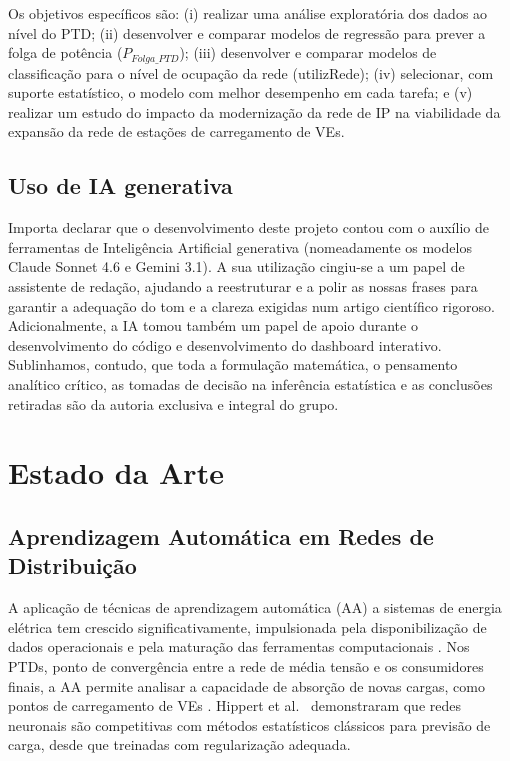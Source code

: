 \documentclass[conference]{IEEEtran}
\begin{document}
Os objetivos específicos são: (i) realizar uma análise exploratória dos dados ao nível do PTD; (ii) desenvolver e comparar modelos de regressão para prever a folga de potência ($P_{Folga\_PTD}$); (iii) desenvolver e comparar modelos de classificação para o nível de ocupação da rede (utilizRede); (iv) selecionar, com suporte estatístico, o modelo com melhor desempenho em cada tarefa; e (v) realizar um estudo do impacto da modernização da rede de IP na viabilidade da expansão da rede de estações de carregamento de VEs.

\subsection{Uso de IA generativa}

Importa declarar que o desenvolvimento deste projeto contou com o auxílio de ferramentas de Inteligência Artificial generativa (nomeadamente os modelos Claude Sonnet 4.6 e Gemini 3.1). A sua utilização cingiu-se a um papel de assistente de redação, ajudando a reestruturar e a polir as nossas frases para garantir a adequação do tom e a clareza exigidas num artigo científico rigoroso. Adicionalmente, a IA tomou também um papel de apoio durante o desenvolvimento do código e desenvolvimento do dashboard interativo. Sublinhamos, contudo, que toda a formulação matemática, o pensamento analítico crítico, as tomadas de decisão na inferência estatística e as conclusões retiradas são da autoria exclusiva e integral do grupo.

\section{Estado da Arte}

\subsection{Aprendizagem Automática em Redes de Distribuição}

A aplicação de técnicas de aprendizagem automática (AA) a sistemas de energia elétrica tem crescido significativamente, impulsionada pela disponibilização de dados operacionais e pela maturação das ferramentas computacionais \cite{hippert2001}. Nos PTDs, ponto de convergência entre a rede de média tensão e os consumidores finais, a AA permite analisar a capacidade de absorção de novas cargas, como pontos de carregamento de VEs \cite{bishop2006}. Hippert et al.\ \cite{hippert2001} demonstraram que redes neuronais são competitivas com métodos estatísticos clássicos para previsão de carga, desde que treinadas com regularização adequada.
\end{document}
